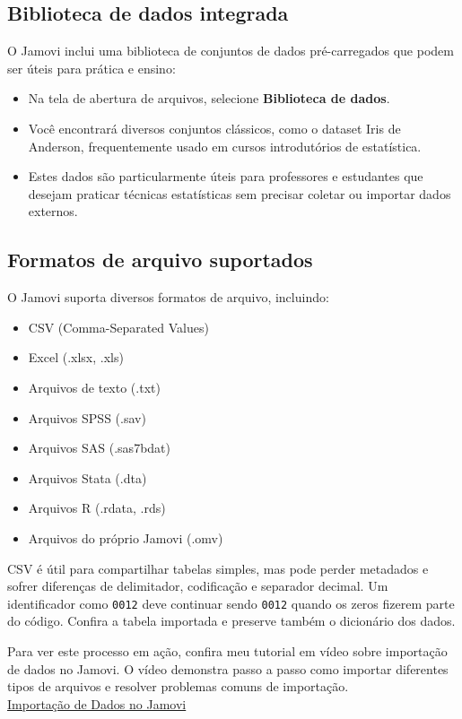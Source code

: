 \subsection{Biblioteca de dados integrada}

O Jamovi inclui uma biblioteca de conjuntos de dados pré-carregados que podem ser úteis para prática e ensino:

\begin{itemize}
    \item Na tela de abertura de arquivos, selecione \textbf{Biblioteca de dados}.
    \item Você encontrará diversos conjuntos clássicos, como o dataset Iris de Anderson, frequentemente usado em cursos introdutórios de estatística.
    \item Estes dados são particularmente úteis para professores e estudantes que desejam praticar técnicas estatísticas sem precisar coletar ou importar dados externos.
\end{itemize}

\subsection{Formatos de arquivo suportados}

O Jamovi suporta diversos formatos de arquivo, incluindo:

\begin{itemize}
    \item CSV (Comma-Separated Values)
    \item Excel (.xlsx, .xls)
    \item Arquivos de texto (.txt)
    \item Arquivos SPSS (.sav)
    \item Arquivos SAS (.sas7bdat)
    \item Arquivos Stata (.dta)
    \item Arquivos R (.rdata, .rds)
    \item Arquivos do próprio Jamovi (.omv)
\end{itemize}

CSV é útil para compartilhar tabelas simples, mas pode perder metadados e sofrer diferenças de delimitador, codificação e separador decimal. Um identificador como \texttt{0012} deve continuar sendo \texttt{0012} quando os zeros fizerem parte do código. Confira a tabela importada e preserve também o dicionário dos dados.

\begin{tcolorbox}[colback=white,colframe=red,title={\faPlayCircle \ Dica de Conteúdo}]
  Para ver este processo em ação, confira meu tutorial em vídeo sobre importação de dados no Jamovi. O vídeo demonstra passo a passo como importar diferentes tipos de arquivos e resolver problemas comuns de importação.\\
  \textcolor{red}{\faYoutube} \href{https://youtu.be/NIpt0wIq5pc?si=IjYrrMqUSNfltmJ9}{Importação de Dados no Jamovi}
\end{tcolorbox}

